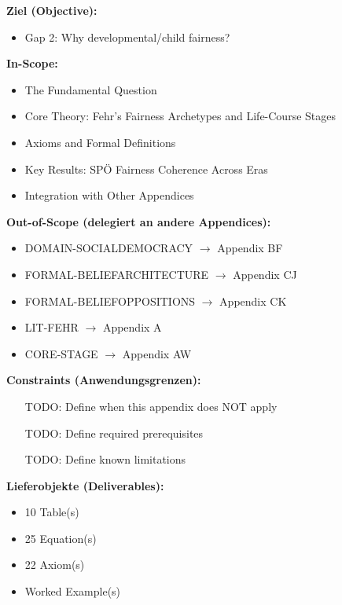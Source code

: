 \begin{tcolorbox}[
    colback=orange!5!white,
    colframe=orange!75!black,
    title={\textbf{Appendix Scope: Ziel / In-Scope / Out-of-Scope / Constraints}},
    fonttitle=\bfseries
]

\textbf{Ziel (Objective):}
\begin{itemize}[nosep]
    \item Gap 2: Why developmental/child fairness?
\end{itemize}

\textbf{In-Scope:}
\begin{itemize}[nosep]
    \item The Fundamental Question
    \item Core Theory: Fehr's Fairness Archetypes and Life-Course Stages
    \item Axioms and Formal Definitions
    \item Key Results: SPÖ Fairness Coherence Across Eras
    \item Integration with Other Appendices
\end{itemize}

\textbf{Out-of-Scope (delegiert an andere Appendices):}
\begin{itemize}[nosep]
    \item DOMAIN-SOCIALDEMOCRACY $\rightarrow$ Appendix BF
    \item FORMAL-BELIEFARCHITECTURE $\rightarrow$ Appendix CJ
    \item FORMAL-BELIEFOPPOSITIONS $\rightarrow$ Appendix CK
    \item LIT-FEHR $\rightarrow$ Appendix A
    \item CORE-STAGE $\rightarrow$ Appendix AW
\end{itemize}

\textbf{Constraints (Anwendungsgrenzen):}
\begin{itemize}[nosep]
    \item [TODO: Define when this appendix does NOT apply]
    \item [TODO: Define required prerequisites]
    \item [TODO: Define known limitations]
\end{itemize}

\textbf{Lieferobjekte (Deliverables):}
\begin{itemize}[nosep]
    \item 10 Table(s)
    \item 25 Equation(s)
    \item 22 Axiom(s)
    \item Worked Example(s)
\end{itemize}

\end{tcolorbox}



